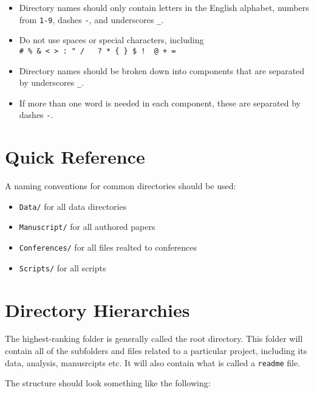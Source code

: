 \documentclass[
]{book}
\providecommand{\tightlist}{%
  \setlength{\itemsep}{0pt}\setlength{\parskip}{0pt}}
\begin{document}
\begin{itemize}
\tightlist
\item
  Directory names should only contain letters in the English alphabet, numbers from \texttt{1-9}, dashes \texttt{-}, and underscores \texttt{\_}.
\item
  Do not use spaces \texttt{} or special characters, including \texttt{\#\ \%\ \&\ \textless{}\ \textgreater{}\ :\ "\ /\ \ \textbar{}\ ?\ *\ \{\ \}\ \$\ !\ \textquotesingle{}\ @\ +\ =}
\item
  Directory names should be broken down into components that are separated by underscores \texttt{\_}.
\item
  If more than one word is needed in each component, these are separated by dashes \texttt{-}.
\end{itemize}

\hypertarget{quick-reference-1}{%
\section*{Quick Reference}\label{quick-reference-1}}

A naming conventions for common directories should be used:

\begin{itemize}
\tightlist
\item
  \texttt{Data/} for all data directories
\item
  \texttt{Manuscript/} for all authored papers
\item
  \texttt{Conferences/} for all files realted to conferences
\item
  \texttt{Scripts/} for all scripts
\end{itemize}

\hypertarget{directory-hierarchies}{%
\section*{Directory Hierarchies}\label{directory-hierarchies}}

The highest-ranking folder is generally called the root directory. This folder will contain all of the subfolders and files related to a particular project, including its data, analysis, manusrcipts etc. It will also contain what is called a \texttt{readme} file.

The structure should look something like the following:
\end{document}
